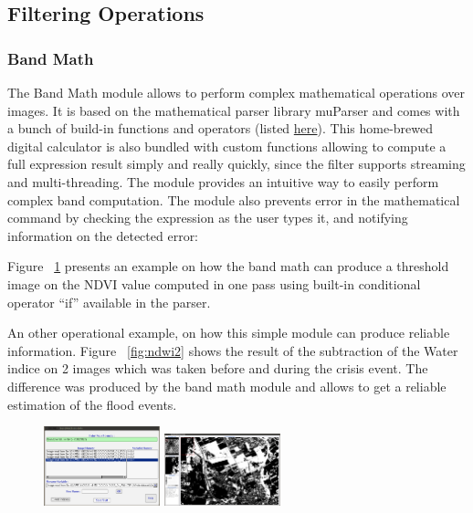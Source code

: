 \subsection{Filtering Operations}
\subsubsection{Band Math}
\label{Band_math module}
The Band Math module allows to perform complex mathematical operations
over images. It is based on the mathematical parser library muParser
and comes with a bunch of build-in functions and operators (listed
\href{http://muparser.sourceforge.net/mup_features.html#idDef2}{here}). This
home-brewed digital calculator is also bundled with custom functions
allowing to compute a full expression result simply and really quickly,
since the filter supports streaming and multi-threading.  The \mont
module provides an intuitive way to easily perform complex band computation. 
The module also prevents error in the mathematical
command by checking the expression as the user types it, and notifying
information on the detected error:

Figure ~\ref{fig:bandmathndviwithres} presents an example on how the band math
can produce a threshold image on the NDVI value computed in one pass
using built-in conditional operator ``if'' available in the parser.

An other operational example, on how this simple module can produce
reliable information.  Figure ~\ref{fig:ndwi2} shows the result of the
subtraction of the Water indice on 2 images which was taken before and
during the crisis event.  The difference was produced by the band math
module and allows to get a reliable estimation of the flood events.


\begin{figure}[!h]
  \center
  \includegraphics[width=0.3\textwidth]{../Art/MonteverdiImages/monteverdi_band_math_ndvi_threshold.png}
  \includegraphics[width=0.3\textwidth]{../Art/MonteverdiImages/monteverdi_band_math_result.png}
  \label{fig:bandmathndviwithres}
\end{figure}


